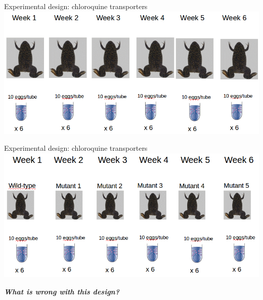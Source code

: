 \documentclass{beamer}
\begin{document}
\begin{frame}{Experimental design: chloroquine transporters}
 \includegraphics[width=\textwidth]{Figures/expdes1}
\end{frame}


\begin{frame}{Experimental design: chloroquine transporters}
 \includegraphics[width=\textwidth]{Figures/expdes2}
 \pause
 
 \emph{\textbf{What is wrong with this design?}}
\end{frame}
\end{document}
